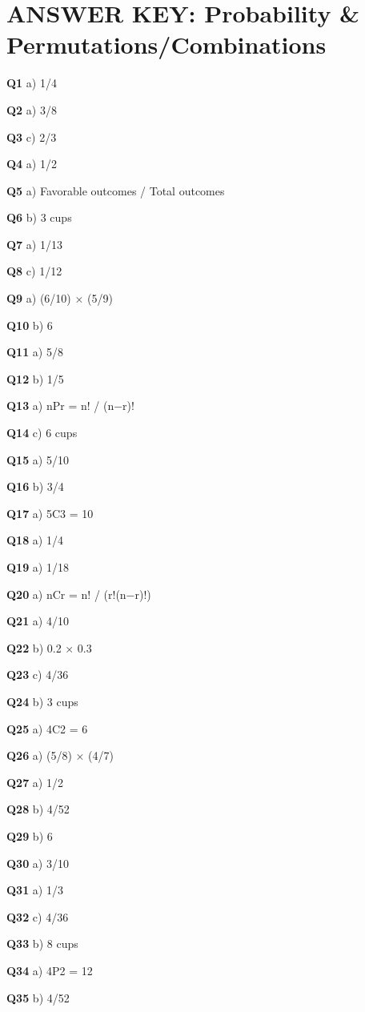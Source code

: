 \section{ANSWER KEY: Probability & Permutations/Combinations}

\textbf{Q1} a) 1/4\par
\textbf{Q2} a) 3/8\par
\textbf{Q3} c) 2/3\par
\textbf{Q4} a) 1/2\par
\textbf{Q5} a) Favorable outcomes / Total outcomes\par
\textbf{Q6} b) 3 cups\par
\textbf{Q7} a) 1/13\par
\textbf{Q8} c) 1/12\par
\textbf{Q9} a) (6/10) × (5/9)\par
\textbf{Q10} b) 6\par
\textbf{Q11} a) 5/8\par
\textbf{Q12} b) 1/5\par
\textbf{Q13} a) nPr = n! / (n−r)!\par
\textbf{Q14} c) 6 cups\par
\textbf{Q15} a) 5/10\par
\textbf{Q16} b) 3/4\par
\textbf{Q17} a) 5C3 = 10\par
\textbf{Q18} a) 1/4\par
\textbf{Q19} a) 1/18\par
\textbf{Q20} a) nCr = n! / (r!(n−r)!)\par
\textbf{Q21} a) 4/10\par
\textbf{Q22} b) 0.2 × 0.3\par
\textbf{Q23} c) 4/36\par
\textbf{Q24} b) 3 cups\par
\textbf{Q25} a) 4C2 = 6\par
\textbf{Q26} a) (5/8) × (4/7)\par
\textbf{Q27} a) 1/2\par
\textbf{Q28} b) 4/52\par
\textbf{Q29} b) 6\par
\textbf{Q30} a) 3/10\par
\textbf{Q31} a) 1/3\par
\textbf{Q32} c) 4/36\par
\textbf{Q33} b) 8 cups\par
\textbf{Q34} a) 4P2 = 12\par
\textbf{Q35} b) 4/52\par
